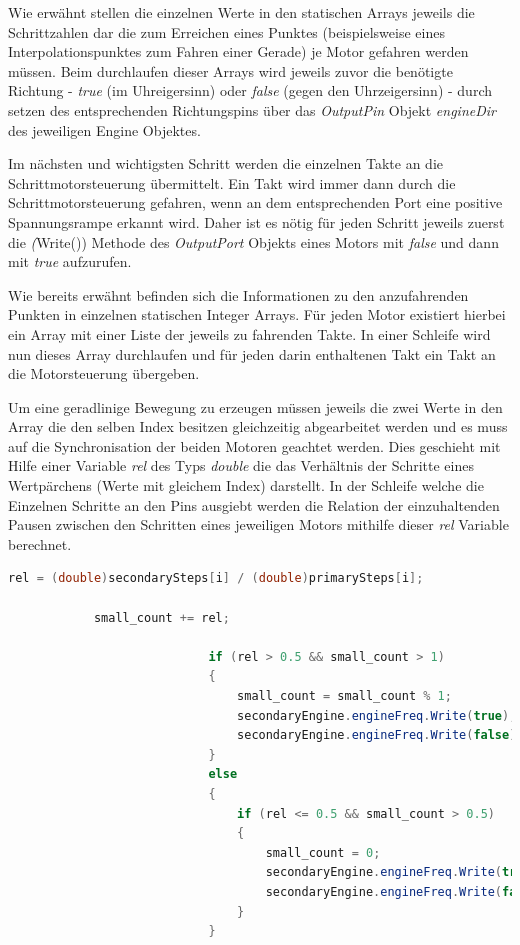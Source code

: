 \begin{itemize}
Wie erwähnt stellen die einzelnen Werte in den statischen Arrays jeweils die Schrittzahlen dar die zum Erreichen eines Punktes (beispielsweise eines Interpolationspunktes zum Fahren einer Gerade) je Motor gefahren werden müssen. Beim durchlaufen dieser Arrays wird jeweils zuvor die benötigte Richtung - \textit{true} (im Uhreigersinn) oder \textit{false} (gegen den Uhrzeigersinn) - durch setzen des entsprechenden Richtungspins über das \textit{OutputPin} Objekt \textit{engineDir} des jeweiligen Engine Objektes.

Im nächsten und wichtigsten Schritt werden die einzelnen Takte an die Schrittmotorsteuerung übermittelt. Ein Takt wird immer dann durch die Schrittmotorsteuerung gefahren, wenn an dem entsprechenden Port eine positive Spannungsrampe erkannt wird. Daher ist es nötig für jeden Schritt jeweils zuerst die \textit(Write()) Methode des \textit{OutputPort} Objekts eines Motors mit \textit{false} und dann mit \textit{true} aufzurufen.

Wie bereits erwähnt befinden sich die Informationen zu den anzufahrenden Punkten in einzelnen statischen Integer Arrays. Für jeden Motor existiert hierbei ein Array mit einer Liste der jeweils zu fahrenden Takte. In einer Schleife wird nun dieses Array durchlaufen und für jeden darin enthaltenen Takt ein Takt an die Motorsteuerung übergeben.

Um eine geradlinige Bewegung zu erzeugen müssen jeweils die zwei Werte in den Array die den selben Index besitzen gleichzeitig abgearbeitet werden und es muss auf die Synchronisation der beiden Motoren geachtet werden. Dies geschieht mit Hilfe einer Variable \textit{rel} des Typs \textit{double} die das Verhältnis der Schritte eines Wertpärchens (Werte mit gleichem Index) darstellt. In der Schleife welche die Einzelnen Schritte an den Pins ausgiebt werden die Relation der einzuhaltenden Pausen zwischen den Schritten eines jeweiligen Motors mithilfe dieser \textit{rel} Variable berechnet.
\begin{lstlisting}[language = csharp, captionpos=b, caption={Beispiel für die Motorsynchronisation}]
			rel = (double)secondarySteps[i] / (double)primarySteps[i];

			small_count += rel;

                            if (rel > 0.5 && small_count > 1)
                            {
                                small_count = small_count % 1;
                                secondaryEngine.engineFreq.Write(true);
                                secondaryEngine.engineFreq.Write(false);
                            }
                            else
                            {
                                if (rel <= 0.5 && small_count > 0.5)
                                {
                                    small_count = 0;
                                    secondaryEngine.engineFreq.Write(true);
                                    secondaryEngine.engineFreq.Write(false);
                                }
                            }


\end{lstlisting}
\end{itemize}
